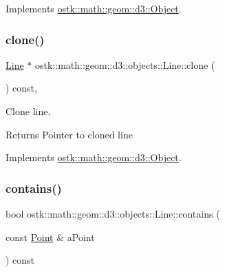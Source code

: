 Implements \hyperlink{classostk_1_1math_1_1geom_1_1d3_1_1_object_ae9194dd6d2bb4df09292ffc84dccdb1d}{ostk\+::math\+::geom\+::d3\+::\+Object}.

\mbox{\label{classostk_1_1math_1_1geom_1_1d3_1_1objects_1_1_line_aaf6fc08cf6b690b88c52d112052ce226}} 
\subsubsection{\texorpdfstring{clone()}{clone()}}
{\footnotesize\ttfamily \hyperlink{classostk_1_1math_1_1geom_1_1d3_1_1objects_1_1_line}{Line} $\ast$ ostk\+::math\+::geom\+::d3\+::objects\+::\+Line\+::clone (\begin{DoxyParamCaption}{ }\end{DoxyParamCaption}) const\hspace{0.3cm}{\ttfamily [override]}, {\ttfamily [virtual]}}



Clone line. 

\begin{DoxyReturn}{Returns}
Pointer to cloned line 
\end{DoxyReturn}


Implements \hyperlink{classostk_1_1math_1_1geom_1_1d3_1_1_object_a676013f9555f6492687f9809b2db887b}{ostk\+::math\+::geom\+::d3\+::\+Object}.

\mbox{\label{classostk_1_1math_1_1geom_1_1d3_1_1objects_1_1_line_a51121a95b14948a800a36f57aa85e55a}} 
\subsubsection{\texorpdfstring{contains()}{contains()}\hspace{0.1cm}{\footnotesize\ttfamily [1/2]}}
{\footnotesize\ttfamily bool ostk\+::math\+::geom\+::d3\+::objects\+::\+Line\+::contains (\begin{DoxyParamCaption}\item[{const \hyperlink{classostk_1_1math_1_1geom_1_1d3_1_1objects_1_1_point}{Point} \&}]{a\+Point }\end{DoxyParamCaption}) const}



